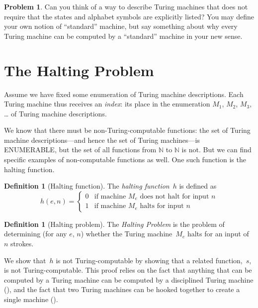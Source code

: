 \documentclass[10pt,a4paper]{article}
\makeatletter
\newcommand*{\olup}[1]{\MakeUppercase{#1}}
\theoremstyle{plain}
\theoremstyle{definition}
\newtheorem{defn}[thm]{Definition}
\newtheorem{prob}{Problem}[section]
\theoremstyle{remark}
\newenvironment{explain}{}{}
\newcommand*{\olfileid}[3]{}
\newcommand*{\olsection}[1]{\section*{#1}}
\newcommand{\olref}{\@ifnextchar[{\olref@i}{\olref@final}}
\def\olref@i[#1]{\@ifnextchar[{\olref@ii}{\olref@final}}
\def\olref@ii[#1]{\@ifnextchar[{\olref@iii}{\olref@final}}
\def\olref@iii[#1]{\olref@final}
\def\olref@final#1{\ref{#1}}
\providecommand{\Nat}{\ensuremath{\mathbb{N}}}
\makeatother
\begin{document}
\begin{prob}
  Can you think of a way to describe Turing machines that does not
  require that the states and alphabet symbols are explicitly listed?
  You may define your own notion of ``standard'' machine, but say
  something about why every Turing machine can be computed by a
  ``standard'' machine in your new sense.
\end{prob}





\olfileid{tur}{und}{hal}
\olsection{The Halting Problem}

\begin{explain}
Assume we have fixed some enumeration of Turing machine
descriptions.  Each Turing machine thus receives an \emph{index}: its
place in the enumeration $M_1$, $M_2$, $M_3$, \dots{} of Turing machine
descriptions.

We know that there must be non-Turing-computable functions: the set of
Turing machine descriptions---and hence the set of Turing machines---is
\olup{enumerable}, but the set of all functions from $\Nat$ to $\Nat$ is
not. But we can find specific examples of non-computable functions as
well. One such function is the halting function.
\end{explain}

\begin{defn}[Halting function]
 The \emph{halting function}~$h$ is defined as
\[
h(e,n) =
\begin{cases}
  \text{0} & \text{if machine~$M_e$ does not halt for input $n$} \\
  \text{1} & \text{if machine~$M_e$ halts for input $n$}
\end{cases}
\]
\end{defn}

\begin{defn}[Halting problem]
The \emph{Halting Problem} is the problem of determining (for any $e$, $n$)
whether the Turing machine~$M_e$ halts for an input of~$n$ strokes.
\end{defn}

\begin{explain}
We show that~$h$ is not Turing-computable by showing that a related
function,~$s$, is not Turing-computable. This proof relies on the fact
that anything that can be computed by a Turing machine can be computed
by a disciplined Turing machine (\olref[mac][dis]{sec}), and the fact
that two Turing machines can be hooked together to create a single
machine (\olref[mac][cmb]{sec}).
\end{explain}
\end{document}
